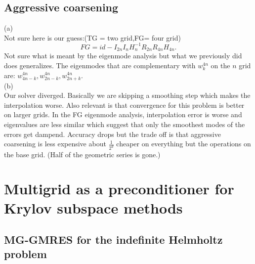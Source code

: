 \documentclass[a4paper,12pt]{article}
\begin{document}
\subsection{Aggressive coarsening}
(a)\\
Not sure here is our guess:(TG = two grid,FG= four grid)
\begin{equation}
    FG = id -I_{2n} I_{n} H_{n}^{-1} R_{2n} R_{4n} H_{4n}.
\end{equation}
Not sure what is meant by the eigenmode analysis but what we previously
did does generalizes. The eigenmodes that are complementary with $w_{k}^{4n}$ on
the $n$ grid are: $w_{4n-k}^{4n},w_{2n-k}^{4n},w_{2n+k}^{4n}$. \\
(b)\\
Our solver diverged. Basically we are skipping a smoothing step which
makes the interpolation worse. Also relevant is that convergence
for this problem is better on larger grids. In the FG eigenmode analysis, interpolation error is worse
and eigenvalues are less similar which suggest that only the smoothest modes of the errors get dampend.
Accuracy drops but the trade off is that aggressive coarsening is less expensive about $\frac{1}{2^{d}}$
cheaper on everything but the operations on the base grid. (Half of the geometric series is gone.)

\section{Multigrid as a preconditioner for Krylov subspace methods}

\subsection{MG-GMRES for the indefinite Helmholtz problem}
\end{document}
